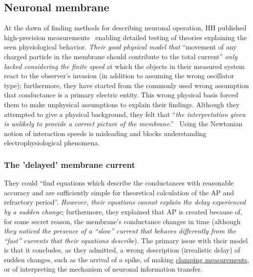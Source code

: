 
\subsection{Neuronal membrane\label{sec:Physics-NeuronalMembrane}}

At the dawn of finding methods for describing neuronal operation,
\gls{HH}
published high-precision measurements~\cite{HodgkinHuxley:1952}
enabling detailed testing of theories explaining the seen physiological
behavior. \emph{Their good physical model that }``movement
of any charged particle in the \hypertarget{Neuronal_membrane}{membrane} should contribute to the total
current'' \emph{only lacked considering the finite speed} at which the objects in
their measured system react to the observer's invasion (in addition to assuming the wrong oscillator type); furthermore,
they have started from the commonly used wrong assumption that conductance
is a primary electric entity. This wrong physical basis forced them
to make unphysical assumptions to explain their findings. Although
they attempted to give a physical background, they felt that ``\emph{the
	interpretation given is unlikely to provide a correct picture of the
	membrane}.''~\cite{HodgkinHuxley:1952} Using the Newtonian notion
of interaction speeds is misleading and blocks understanding electrophysiological
phenomena. 

\subsubsection{The 'delayed' membrane current\label{sec:Physics-DelayedMembraneCurrent}}


They could ``find equations which describe the conductances with
reasonable accuracy and are sufficiently simple for theoretical calculation
of the \gls{AP} and refractory period''. \emph{However, their equations
	cannot explain the delay experienced by a sudden change}; furthermore,
they explained that
AP is created because of, for some secret
reason, the membrane's conductance changes in time (although \emph{they noticed the presence of a ``slow'' current
	that behaves differently from the ``fast'' currents that their equations
	describe}). The primary issue with their model is that
it concludes, as they admitted, a wrong description (irrealistic delay) of
sudden changes, such as the arrival of a spike, of making \hyperlink{voltage-clamping}{clamping
measurements}, or of interpreting the mechanism of neuronal information
transfer. 

